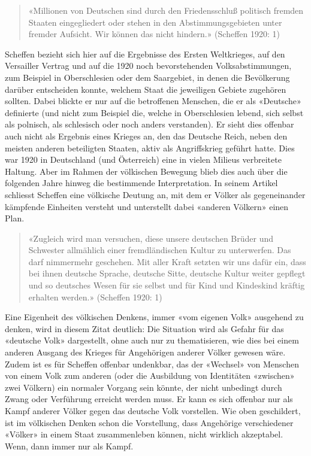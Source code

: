 \documentclass[a4paper,
fontsize=11pt,
oneside,
numbers=noperiodatend,
parskip=half-,
bibliography=totoc,
final
]{scrartcl}
\begin{document}
\begin{quote}
«Millionen von Deutschen sind durch den Friedensschluß politisch fremden
Staaten eingegliedert oder stehen in den Abstimmungsgebieten unter
fremder Aufsicht. Wir können das nicht hindern.» (Scheffen 1920: 1)
\end{quote}

Scheffen bezieht sich hier auf die Ergebnisse des Ersten Weltkrieges,
auf den Versailler Vertrag und auf die 1920 noch bevorstehenden
Volksabstimmungen, zum Beispiel in Oberschlesien oder dem Saargebiet, in
denen die Bevölkerung darüber entscheiden konnte, welchem Staat die
jeweiligen Gebiete zugehören sollten. Dabei blickte er nur auf die
betroffenen Menschen, die er als «Deutsche» definierte (und nicht zum
Beispiel die, welche in Oberschlesien lebend, sich selbst als polnisch,
als schlesisch oder noch anders verstanden). Er sieht dies offenbar auch
nicht als Ergebnis eines Krieges an, den das Deutsche Reich, neben den
meisten anderen beteiligten Staaten, aktiv als Angriffskrieg geführt
hatte. Dies war 1920 in Deutschland (und Österreich) eine in vielen
Milieus verbreitete Haltung. Aber im Rahmen der völkischen Bewegung
blieb dies auch über die folgenden Jahre hinweg die bestimmende
Interpretation. In seinem Artikel schliesst Scheffen eine völkische
Deutung an, mit dem er Völker als gegeneinander kämpfende Einheiten
versteht und unterstellt dabei «anderen Völkern» einen Plan.

\begin{quote}
«Zugleich wird man versuchen, diese unsere deutschen Brüder und
Schwester allmählich einer fremdländischen Kultur zu unterwerfen. Das
darf nimmermehr geschehen. Mit aller Kraft setzten wir uns dafür ein,
dass bei ihnen deutsche Sprache, deutsche Sitte, deutsche Kultur weiter
gepflegt und so deutsches Wesen für sie selbst und für Kind und
Kindeskind kräftig erhalten werden.» (Scheffen 1920: 1)
\end{quote}

Eine Eigenheit des völkischen Denkens, immer «vom eigenen Volk»
ausgehend zu denken, wird in diesem Zitat deutlich: Die Situation wird
als Gefahr für das «deutsche Volk» dargestellt, ohne auch nur zu
thematisieren, wie dies bei einem anderen Ausgang des Krieges für
Angehörigen anderer Völker gewesen wäre. Zudem ist es für Scheffen
offenbar undenkbar, das der «Wechsel» von Menschen von einem Volk zum
anderen (oder die Ausbildung von Identitäten «zwischen» zwei Völkern)
ein normaler Vorgang sein könnte, der nicht unbedingt durch Zwang oder
Verführung erreicht werden muss. Er kann es sich offenbar nur als Kampf
anderer Völker gegen das deutsche Volk vorstellen. Wie oben geschildert,
ist im völkischen Denken schon die Vorstellung, dass Angehörige
verschiedener «Völker» in einem Staat zusammenleben können, nicht
wirklich akzeptabel. Wenn, dann immer nur als Kampf.
\end{document}
